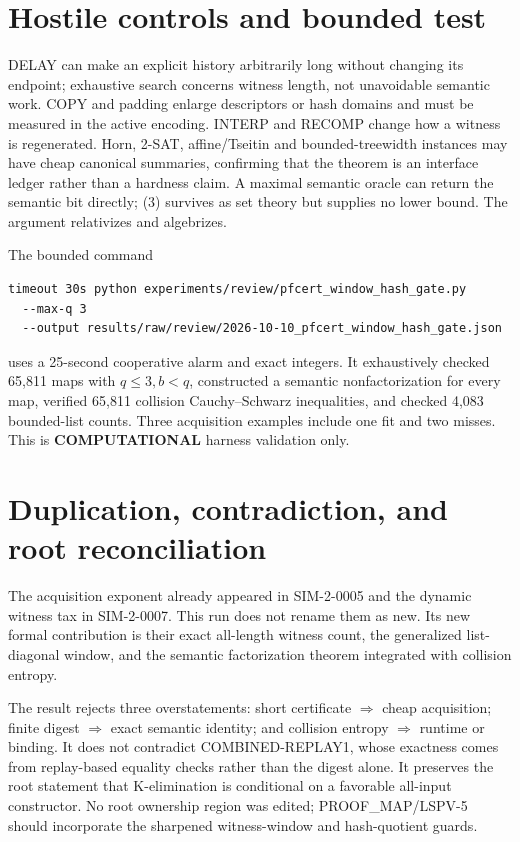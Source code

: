 \documentclass[11pt]{article}
\begin{document}
\section{Hostile controls and bounded test}
DELAY can make an explicit history arbitrarily long without changing its
endpoint; exhaustive search concerns witness length, not unavoidable
semantic work.  COPY and padding enlarge descriptors or hash domains and
must be measured in the active encoding.  INTERP and RECOMP change how a
witness is regenerated.  Horn, 2-SAT, affine/Tseitin and bounded-treewidth
instances may have cheap canonical summaries, confirming that the theorem
is an interface ledger rather than a hardness claim.  A maximal semantic
oracle can return the semantic bit directly; (3) survives as set theory
but supplies no lower bound.  The argument relativizes and algebrizes.

The bounded command
\begin{verbatim}
timeout 30s python experiments/review/pfcert_window_hash_gate.py
  --max-q 3
  --output results/raw/review/2026-10-10_pfcert_window_hash_gate.json
\end{verbatim}
uses a 25-second cooperative alarm and exact integers.  It exhaustively
checked 65,811 maps with $q\le3,b<q$, constructed a semantic
nonfactorization for every map, verified 65,811 collision
Cauchy--Schwarz inequalities, and checked 4,083 bounded-list counts.
Three acquisition examples include one fit and two misses.  This is
\textbf{COMPUTATIONAL} harness validation only.

\section{Duplication, contradiction, and root reconciliation}
The acquisition exponent already appeared in SIM-2-0005 and the dynamic
witness tax in SIM-2-0007.  This run does not rename them as new.  Its new
formal contribution is their exact all-length witness count, the generalized
list-diagonal window, and the semantic factorization theorem integrated
with collision entropy.

The result rejects three overstatements: short certificate
$\Rightarrow$ cheap acquisition; finite digest $\Rightarrow$ exact semantic
identity; and collision entropy $\Rightarrow$ runtime or binding.  It does
not contradict COMBINED-REPLAY1, whose exactness comes from replay-based
equality checks rather than the digest alone.  It preserves the root
statement that K-elimination is conditional on a favorable all-input
constructor.  No root ownership region was edited; PROOF\_MAP/LSPV-5 should
incorporate the sharpened witness-window and hash-quotient guards.
\end{document}
